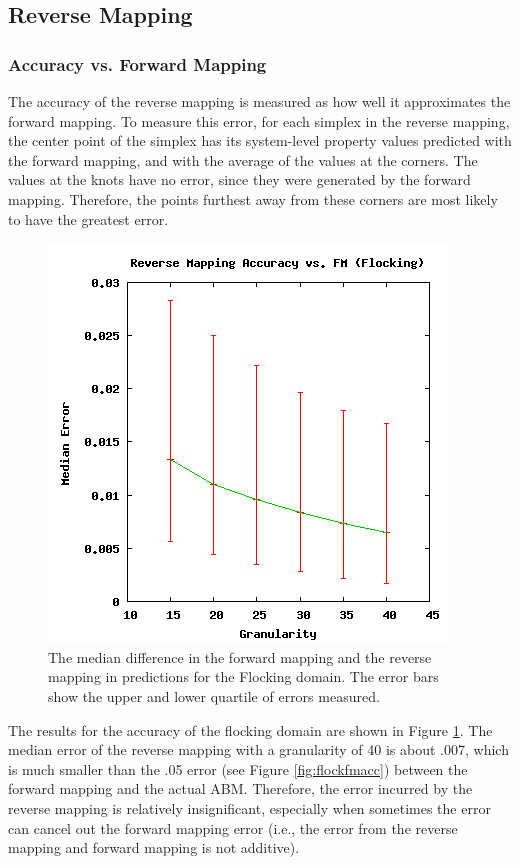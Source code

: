  \subsection{Reverse Mapping}

  \subsubsection{Accuracy vs. Forward Mapping}

The accuracy of the reverse mapping is measured as how well it approximates the forward mapping.
To measure this error, for each simplex in the reverse mapping, the center point of the simplex has its system-level property values predicted with the forward mapping, and with the average of the values at the corners.
The values at the knots have no error, since they were generated by the forward mapping.
Therefore, the points furthest away from these corners are most likely to have the greatest error.

\begin{figure}[ht]
\centering
\includegraphics[scale=.5]{images/results_flocking/rmacc.png}
\caption{The median difference in the forward mapping and the reverse mapping in predictions for the Flocking domain.
The error bars show the upper and lower quartile of errors measured.}
\label{fig:flockrmacc}
\end{figure}

The results for the accuracy of the flocking domain are shown in Figure \ref{fig:flockrmacc}.
The median error of the reverse mapping with a granularity of 40 is about .007, which is much smaller than the .05 error (see Figure \ref{fig:flockfmacc}) between the forward mapping and the actual ABM.
Therefore, the error incurred by the reverse mapping is relatively insignificant, especially when sometimes the error can cancel out the forward mapping error (i.e., the error from the reverse mapping and forward mapping is not additive).


